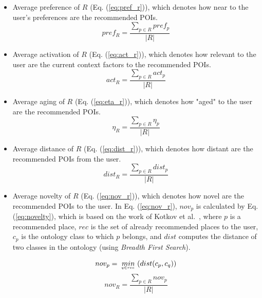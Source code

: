 \begin{itemize}
    \item Average preference of $R$ (Eq. (\ref{eq:pref_r})), which denotes how near to the user's preferences are the recommended POIs.
    \begin{equation} \label{eq:pref_r}
        pref_{R} = \frac{ \displaystyle \sum_{p \in R}{pref_p} }{| R |}
    \end{equation}

    \item Average activation of $R$ (Eq. (\ref{eq:act_r})), which denotes how relevant to the user are the current context factors %
    to the recommended POIs.
    \begin{equation} \label{eq:act_r}
        act_{R} = \frac{ \displaystyle \sum_{p \in R}{act_p} }{| R |}
    \end{equation}

    \item Average aging of $R$ (Eq. (\ref{eq:eta_r})), which denotes how "aged" to the user are the recommended POIs.
    \begin{equation} \label{eq:eta_r}
        \eta_{R} = \frac{ \displaystyle \sum_{p \in R}{\eta_p} }{| R |}
    \end{equation}

    \item Average distance of $R$ (Eq. (\ref{eq:dist_r})), which denotes how distant are the recommended POIs from the user.
    \begin{equation} \label{eq:dist_r}
        dist_{R} = \frac{ \displaystyle \sum_{p \in R}{dist_{p}} }{| R |}
    \end{equation}

    \item Average novelty of $R$ (Eq. (\ref{eq:nov_r})), which denotes how novel are the recommended POIs to the user. In Eq. (\ref{eq:nov_r}), $nov_{p}$ is calculated by Eq. (\ref{eq:novelty}), which is based on the work of Kotkov et al.~\cite{kotkov2016survey}, where $p$ is a recommended place, $rec$ is the set of already recommended places to the user, $c_p$ is the ontology class to which $p$ belongs, and $dist$ computes the distance of two classes in the ontology (using \textit{Breadth First Search}).

    \begin{equation} \label{eq:novelty}
        nov_{p} = \  \underaccent{q \in rec}{min} \  ( dist( c_p, c_q ) )
    \end{equation}
    \begin{equation} \label{eq:nov_r}
        nov_{R} = \frac{ \displaystyle \sum_{p \in R}{nov_{p}} }{| R |}
    \end{equation}
\end{itemize}

